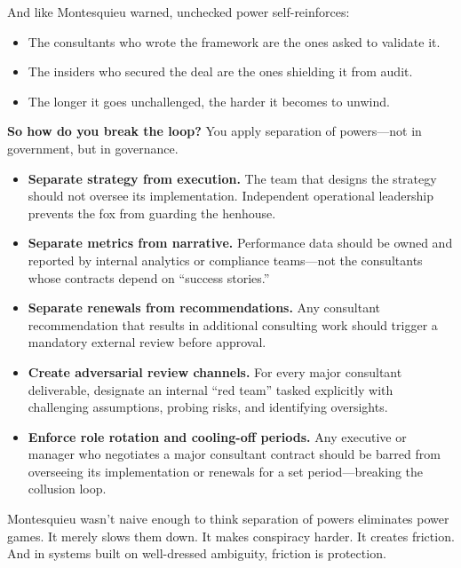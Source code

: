 And like Montesquieu warned, unchecked power self-reinforces:  
\begin{itemize}
  \item The consultants who wrote the framework are the ones asked to validate it.  
  \item The insiders who secured the deal are the ones shielding it from audit.  
  \item The longer it goes unchallenged, the harder it becomes to unwind.
\end{itemize}

\medskip

\textbf{So how do you break the loop?}  
You apply separation of powers—not in government, but in governance.

\begin{itemize}
  \item \textbf{Separate strategy from execution.} The team that designs the strategy should not oversee its implementation. Independent operational leadership prevents the fox from guarding the henhouse.

  \item \textbf{Separate metrics from narrative.} Performance data should be owned and reported by internal analytics or compliance teams—not the consultants whose contracts depend on “success stories.”

  \item \textbf{Separate renewals from recommendations.} Any consultant recommendation that results in additional consulting work should trigger a mandatory external review before approval.

  \item \textbf{Create adversarial review channels.} For every major consultant deliverable, designate an internal “red team” tasked explicitly with challenging assumptions, probing risks, and identifying oversights.

  \item \textbf{Enforce role rotation and cooling-off periods.} Any executive or manager who negotiates a major consultant contract should be barred from overseeing its implementation or renewals for a set period—breaking the collusion loop.
\end{itemize}

Montesquieu wasn’t naive enough to think separation of powers eliminates power games. It merely slows them down. It makes conspiracy harder. It creates friction. And in systems built on well-dressed ambiguity, friction is protection.

